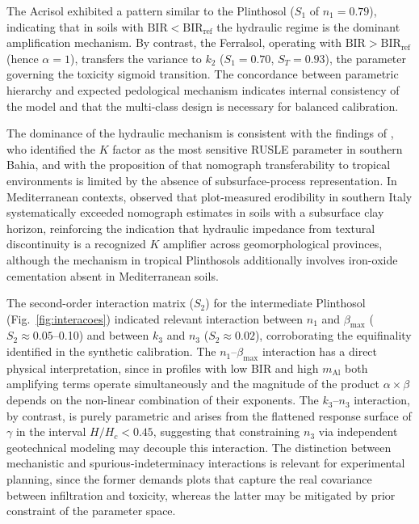 \documentclass[preprint,review,12pt,authoryear]{elsarticle}
\begin{document}
The Acrisol exhibited a pattern similar to the Plinthosol ($S_1$ of $n_1 = 0.79$), indicating that in soils with $\mathrm{BIR} < \mathrm{BIR_{ref}}$ the hydraulic regime is the dominant amplification mechanism. By contrast, the Ferralsol, operating with $\mathrm{BIR} > \mathrm{BIR_{ref}}$ (hence $\alpha = 1$), transfers the variance to $k_2$ ($S_1 = 0.70$, $S_T = 0.93$), the parameter governing the toxicity sigmoid transition. The concordance between parametric hierarchy and expected pedological mechanism indicates internal consistency of the model and that the multi-class design is necessary for balanced calibration.

The dominance of the hydraulic mechanism is consistent with the findings of \citet{francois_et_al_2024}, who identified the $K$ factor as the most sensitive RUSLE parameter in southern Bahia, and with the proposition of \citet{alewell_et_al_2019} that nomograph transferability to tropical environments is limited by the absence of subsurface-process representation. In Mediterranean contexts, \citet{bagarello_et_al_2012} observed that plot-measured erodibility in southern Italy systematically exceeded nomograph estimates in soils with a subsurface clay horizon, reinforcing the indication that hydraulic impedance from textural discontinuity is a recognized $K$ amplifier across geomorphological provinces, although the mechanism in tropical Plinthosols additionally involves iron-oxide cementation absent in Mediterranean soils.

The second-order interaction matrix ($S_2$) for the intermediate Plinthosol (Fig.~\ref{fig:interacoes}) indicated relevant interaction between $n_1$ and $\beta_{\max}$ ($S_2 \approx 0.05$--0.10) and between $k_3$ and $n_3$ ($S_2 \approx 0.02$), corroborating the equifinality identified in the synthetic calibration. The $n_1$--$\beta_{\max}$ interaction has a direct physical interpretation, since in profiles with low BIR and high $m_{\mathrm{Al}}$ both amplifying terms operate simultaneously and the magnitude of the product $\alpha \times \beta$ depends on the non-linear combination of their exponents. The $k_3$--$n_3$ interaction, by contrast, is purely parametric and arises from the flattened response surface of $\gamma$ in the interval $H/H_c < 0.45$, suggesting that constraining $n_3$ via independent geotechnical modeling may decouple this interaction. The distinction between mechanistic and spurious-indeterminacy interactions is relevant for experimental planning, since the former demands plots that capture the real covariance between infiltration and toxicity, whereas the latter may be mitigated by prior constraint of the parameter space.
\end{document}
